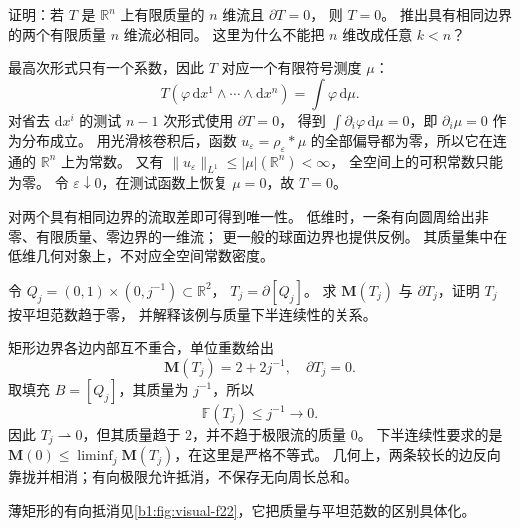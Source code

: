 \begin{exercise}\label{b1:ex:app-d-top-dimensional-uniqueness}
证明：若 \(T\) 是 \(\mathbb R^n\) 上有限质量的 \(n\) 维流且 \(\partial T=0\)，
则 \(T=0\)。
推出具有相同边界的两个有限质量 \(n\) 维流必相同。
这里为什么不能把 \(n\) 维改成任意 \(k<n\)？
\end{exercise}
\begin{solution}
最高次形式只有一个系数，因此 \(T\) 对应一个有限符号测度 \(\mu\)：
\[
 T(\varphi\,\mathrm{d}x^1\wedge\cdots\wedge \mathrm{d}x^n)=\int\varphi\,\mathrm{d}\mu.
\]
对省去 \(\mathrm{d}x^i\) 的测试 \(n-1\) 次形式使用 \(\partial T=0\)，
得到 \(\int\partial_i\varphi\,\mathrm{d}\mu=0\)，即 \(\partial_i\mu=0\) 作为分布成立。
用光滑核卷积后，函数 \(u_\varepsilon=\rho_\varepsilon*\mu\)
的全部偏导都为零，所以它在连通的 \(\mathbb R^n\) 上为常数。
又有
\(\|u_\varepsilon\|_{L^1}\leq|\mu|(\mathbb R^n)<\infty\)，
全空间上的可积常数只能为零。
令 \(\varepsilon\downarrow0\)，在测试函数上恢复 \(\mu=0\)，故 \(T=0\)。

对两个具有相同边界的流取差即可得到唯一性。
低维时，一条有向圆周给出非零、有限质量、零边界的一维流；
更一般的球面边界也提供反例。
其质量集中在低维几何对象上，不对应全空间常数密度。
\end{solution}

\begin{exercise}\label{b1:ex:app-d-thin-rectangles}
令 \(Q_j=(0,1)\times(0,j^{-1})\subset\mathbb R^2\)，
\(T_j=\partial[Q_j]\)。
求 \(\mathbf M(T_j)\) 与 \(\partial T_j\)，证明 \(T_j\) 按平坦范数趋于零，
并解释该例与质量下半连续性的关系。
\end{exercise}
\begin{solution}
矩形边界各边内部互不重合，单位重数给出
\[
 \mathbf M(T_j)=2+2j^{-1},\quad \partial T_j=0.
\]
取填充 \(B=[Q_j]\)，其质量为 \(j^{-1}\)，所以
\[
 \mathbb F(T_j)\leq j^{-1}\longrightarrow0.
\]
因此 \(T_j\rightharpoonup0\)，但其质量趋于 \(2\)，并不趋于极限流的质量 \(0\)。
下半连续性要求的是
\(\mathbf M(0)\leq\liminf_j\mathbf M(T_j)\)，在这里是严格不等式。
几何上，两条较长的边反向靠拢并相消；有向极限允许抵消，不保存无向周长总和。
\end{solution}



薄矩形的有向抵消见\cref{b1:fig:visual-f22}，它把质量与平坦范数的区别具体化。


